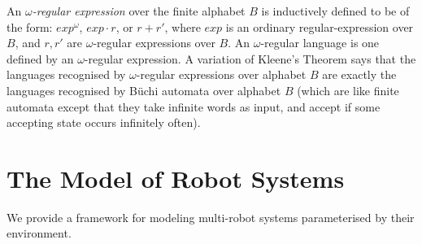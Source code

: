 \documentclass{aamas2015}
\def\nat{\mathbb{N}}
\newcommand{\sr}[1]{\footnote{{\color{red} Note. #1}}}
\begin{document}
An {\em $\omega$-regular expression} over the finite alphabet $B$ is inductively defined to be of the form: $exp^\omega$, $exp \cdot r$, or $r + r'$, where $exp$ is an ordinary regular-expression over $B$, and $r,r'$ are $\omega$-regular expressions over $B$. An {$\omega$-regular language} is one defined by an $\omega$-regular expression. A variation of Kleene's Theorem says that the languages recognised by $\omega$-regular expressions over alphabet $B$ are exactly the languages recognised by B\"uchi automata over alphabet $B$ (which are like finite automata except that they take infinite words as input, and accept if some accepting state occurs infinitely often).

\iffalse
We will use the McNaughton-Papert Theorem (and its generalisation to infinite-words) (see \cite{Thomas96,DiGa08}): it states that a regular language of ($\omega$)-words is star-free if and only if it is definable in first-order logic. For instance, the language $0^*1^*$ over alphabet $\{0,1\}$ is definable by the formula $\exists z. \forall x. [x \leq z \to P_0(x)] \wedge [x \not \leq z \to P_1(x)]$, and by the star-free regular expression $\neg( \neg{\emptyset} \cdot 1 \cdot 0 \cdot  \neg{\emptyset})$. Formally, a word $w \in B^*$ is coded as a structure with domain $[|w|]$, unary predicates $P_b := \{i \leq |w| : w_i = b\}$ (for $b \in B$), and the usual linear order $\leq$ on $[|w|]$; and thus the first-order definition may make use of these unary predicates and the linear order. 
\fi





\section{The Model of Robot Systems}

We provide a framework for modeling multi-robot systems parameterised by their environment. 
\end{document}
